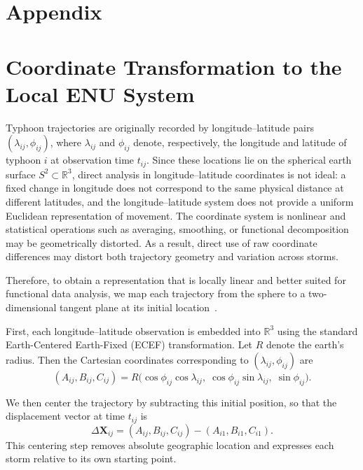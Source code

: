 \documentclass{article}
\begin{document}



\newpage
\appendix
\onecolumn
\section*{Appendix}
\section{Coordinate Transformation to the Local ENU System}
\label{sec:enu}
Typhoon trajectories are originally recorded by longitude--latitude pairs $(\lambda_{ij}, \phi_{ij})$, where $\lambda_{ij}$ and $\phi_{ij}$ denote, respectively, the longitude and latitude of typhoon $i$ at observation time $t_{ij}$. Since these locations lie on the spherical earth surface $S^2 \subset \mathbb{R}^3$, direct analysis in longitude--latitude coordinates is not ideal: a fixed change in longitude does not correspond to the same physical distance at different latitudes, and the longitude--latitude system does not provide a uniform Euclidean representation of movement. The coordinate system is nonlinear and statistical operations such as averaging, smoothing, or functional decomposition may be geometrically distorted. As a result, direct use of raw coordinate differences may distort both trajectory geometry and variation across storms. 

Therefore, to obtain a representation that is locally linear and better suited for functional data analysis, we map each trajectory from the sphere to a two-dimensional tangent plane at its initial location~\cite{esa_navipedia_enu}.

First, each longitude--latitude observation is embedded into $\mathbb{R}^3$ using the standard Earth-Centered Earth-Fixed (ECEF) transformation. Let $R$ denote the earth's radius. Then the Cartesian coordinates corresponding to $(\lambda_{ij}, \phi_{ij})$ are
\[
(A_{ij}, B_{ij}, C_{ij})
=
R\big(
\cos\phi_{ij}\cos\lambda_{ij},\;
\cos\phi_{ij}\sin\lambda_{ij},\;
\sin\phi_{ij}
\big).
\]

We then center the trajectory by subtracting this initial position, so that the displacement vector at time $t_{ij}$ is
\[
\Delta \mathbf{X}_{ij}
=
(A_{ij}, B_{ij}, C_{ij}) - (A_{i1}, B_{i1}, C_{i1}).
\]
This centering step removes absolute geographic location and expresses each storm relative to its own starting point.
\end{document}
